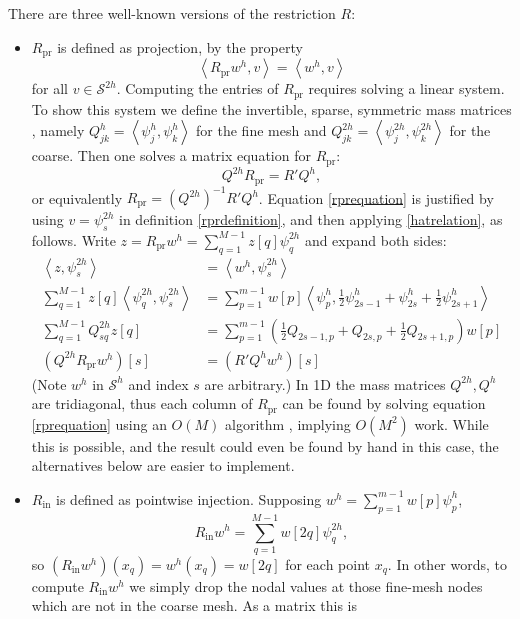 \documentclass[letterpaper,final,12pt,reqno]{amsart}
\newcommand{\ip}[2]{\left<#1,#2\right>}
\newcommand{\Rpr}{R_{\text{pr}}}
\newcommand{\Rin}{R_{\text{in}}}
\begin{document}
There are three well-known versions of the restriction $R$:
\begin{itemize}
\item $\Rpr$ is defined as projection, by the property
\begin{equation}
  \ip{\Rpr w^h}{v} = \ip{w^h}{v} \label{rprdefinition}
\end{equation}
for all $v\in \mathcal{S}^{2h}$.  Computing the entries of $\Rpr$ requires solving a linear system.  To show this system we define the invertible, sparse, symmetric mass matrices \cite{Elmanetal2014}, namely $Q_{jk}^{h} = \ip{\psi_j^{h}}{\psi_k^{h}}$ for the fine mesh and $Q_{jk}^{2h} = \ip{\psi_j^{2h}}{\psi_k^{2h}}$ for the coarse.  Then one solves a matrix equation for $\Rpr$:
\begin{equation}
  Q^{2h} \Rpr = R' Q^{h},  \label{rprequation}
\end{equation}
or equivalently $\Rpr = (Q^{2h})^{-1} R' Q^{h}$.  Equation \eqref{rprequation} is justified by using $v=\psi_s^{2h}$ in definition \eqref{rprdefinition}, and then applying \eqref{hatrelation}, as follows.  Write $z = \Rpr w^h = \sum_{q=1}^{M-1} z[q] \psi_q^{2h}$ and expand both sides:
\begin{align*}
\ip{z}{\psi_s^{2h}} &= \ip{w^h}{\psi_s^{2h}} \\
\sum_{q=1}^{M-1} z[q] \ip{\psi_q^{2h}}{\psi_s^{2h}} &= \sum_{p=1}^{m-1} w[p] \ip{\psi_p^{h}}{\frac{1}{2} \psi_{2s-1}^{h} + \psi_{2s}^{h} + \frac{1}{2} \psi_{2s+1}^{h}} \\
\sum_{q=1}^{M-1} Q_{sq}^{2h} z[q] &= \sum_{p=1}^{m-1} \left(\frac{1}{2} Q_{2s-1,p} + Q_{2s,p} + \frac{1}{2} Q_{2s+1,p}\right) w[p] \\
(Q^{2h} \Rpr w^h)[s] &= (R' Q^h w^h)[s]
\end{align*}
(Note $w^h$ in $\mathcal{S}^h$ and index $s$ are arbitrary.)  In 1D the mass matrices $Q^{2h},Q^h$ are tridiagonal, thus each column of $\Rpr$ can be found by solving equation \eqref{rprequation} using an $O(M)$ algorithm \cite{TrefethenBau1997}, implying $O(M^2)$ work.  While this is possible, and the result could even be found by hand in this case, the alternatives below are easier to implement.
\item $\Rin$ is defined as pointwise injection.  Supposing $w^h = \sum_{p=1}^{m-1} w[p] \psi_p^{h}$,
\begin{equation}
  \Rin w^h = \sum_{q=1}^{M-1} w[2q] \psi_q^{2h}, \label{rindefinition}
\end{equation}
so $(\Rin w^h)(x_q) = w^h(x_q) = w[2q]$ for each point $x_q$.  In other words, to compute $\Rin w^h$ we simply drop the nodal values at those fine-mesh nodes which are not in the coarse mesh.  As a matrix this is

\end{itemize}
\end{document}

